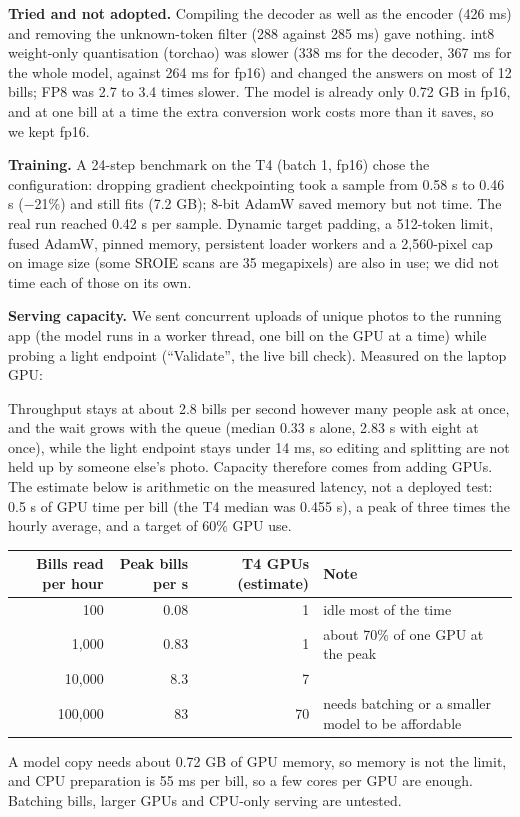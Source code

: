 \textbf{Tried and not adopted.} Compiling the decoder as well as the encoder (426 ms) and removing the unknown-token filter (288 against 285 ms) gave nothing. int8 weight-only quantisation (torchao) was slower (338 ms for the decoder, 367 ms for the whole model, against 264 ms for fp16) and changed the answers on most of 12 bills; FP8 was 2.7 to 3.4 times slower. The model is already only 0.72 GB in fp16, and at one bill at a time the extra conversion work costs more than it saves, so we kept fp16.

\textbf{Training.} A 24-step benchmark on the T4 (batch 1, fp16) chose the configuration: dropping gradient checkpointing took a sample from 0.58 s to 0.46 s ($-$21\%) and still fits (7.2 GB); 8-bit AdamW saved memory but not time. The real run reached 0.42 s per sample. Dynamic target padding, a 512-token limit, fused AdamW, pinned memory, persistent loader workers and a 2,560-pixel cap on image size (some SROIE scans are 35 megapixels) are also in use; we did not time each of those on its own.

\textbf{Serving capacity.} We sent concurrent uploads of unique photos to the running app (the model runs in a worker thread, one bill on the GPU at a time) while probing a light endpoint (``Validate'', the live bill check). Measured on the laptop GPU:
\begin{center}\end{center}
Throughput stays at about 2.8 bills per second however many people ask at once, and the wait grows with the queue (median 0.33 s alone, 2.83 s with eight at once), while the light endpoint stays under 14 ms, so editing and splitting are not held up by someone else's photo. Capacity therefore comes from adding GPUs. The estimate below is arithmetic on the measured latency, not a deployed test: 0.5 s of GPU time per bill (the T4 median was 0.455 s), a peak of three times the hourly average, and a target of 60\% GPU use.
\begin{center}\footnotesize
\begin{tabular}{@{}rrrp{6.2cm}@{}}
\toprule
Bills read per hour & Peak bills per s & T4 GPUs (estimate) & Note\\
\midrule
100 & 0.08 & 1 & idle most of the time\\
1,000 & 0.83 & 1 & about 70\% of one GPU at the peak\\
10,000 & 8.3 & 7 & \\
100,000 & 83 & 70 & needs batching or a smaller model to be affordable\\
\bottomrule
\end{tabular}
\end{center}
A model copy needs about 0.72 GB of GPU memory, so memory is not the limit, and CPU preparation is 55 ms per bill, so a few cores per GPU are enough. Batching bills, larger GPUs and CPU-only serving are untested.
\normalsize
